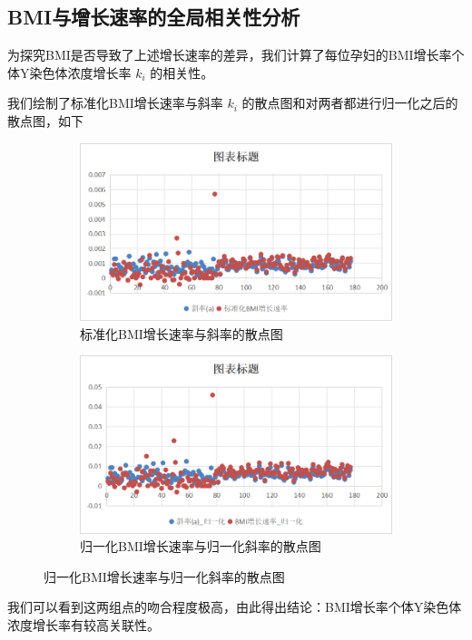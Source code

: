 \documentclass{article}
\begin{document}
\subsection{BMI与增长速率的全局相关性分析}
为探究BMI是否导致了上述增长速率的差异，我们计算了每位孕妇的BMI增长率个体Y染色体浓度增长率 $k_i$ 的相关性。

我们绘制了标准化BMI增长速率与斜率 $k_i$ 的散点图和对两者都进行归一化之后的散点图，如下
\begin{figure}[H]
    \centering
    \begin{subfigure}[b]{0.45\textwidth}  %
        \centering
        \includegraphics[width=\textwidth]{graph/biaozhunhua.png}  %
        \caption{标准化BMI增长速率与斜率的散点图}  %
        \label{fig:sub1}  %
    \end{subfigure}
    \hspace{0.05\textwidth}  %
    \begin{subfigure}[b]{0.45\textwidth}
        \centering
        \includegraphics[width=\textwidth]{graph/guiyihua.png}
        \caption{归一化BMI增长速率与归一化斜率的散点图}
        \label{fig:sub2}
    \end{subfigure}
    \label{fig:two}  %
\end{figure}
我们可以看到这两组点的吻合程度极高，由此得出结论：BMI增长率个体Y染色体浓度增长率有较高关联性。
\end{document}
